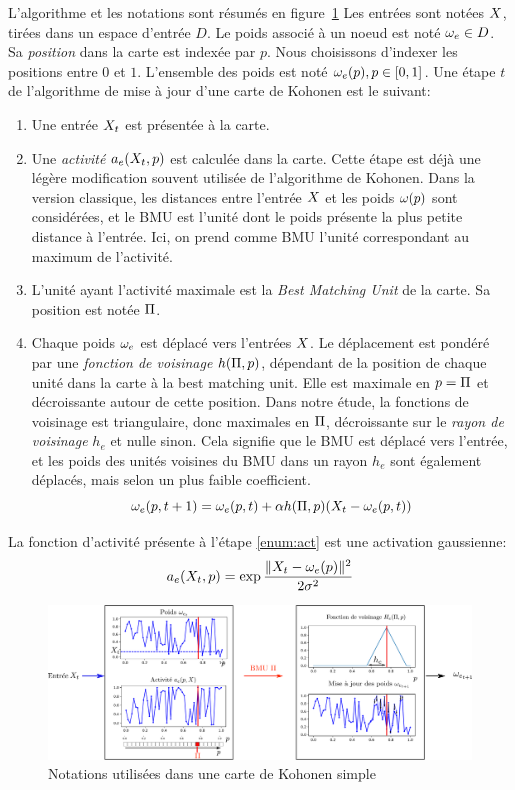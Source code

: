L'algorithme et les notations sont résumés en figure~\ref{fig:one_map_not}
Les entrées sont notées $X$, tirées dans un espace d'entrée $D$. Le poids associé à un noeud est noté $\omega_e \in D$. Sa \emph{position} dans la carte est indexée par $p$. Nous choisissons d'indexer les positions entre $0$ et $1$. L'ensemble des poids est noté ${\omega_e(p), p \in [0,1]}$.
Une étape $t$ de l'algorithme de mise à jour d'une carte de Kohonen est le suivant:
\begin{enumerate}
\item\label{enum:inp} Une entrée $X_t$ est présentée à la carte.
\item\label{enum:act} Une \emph{activité} $a_e(X_t,p)$ est calculée dans la carte. 
Cette étape est déjà une légère modification souvent utilisée de l'algorithme de Kohonen. 
Dans la version classique, les distances entre l'entrée $X$ et les poids $\omega(p)$ sont considérées, et le BMU est l'unité dont le poids présente la plus petite distance à l'entrée. Ici, on prend comme BMU l'unité correspondant au maximum de l'activité.
\item\label{enum:bmu} L'unité ayant l'activité maximale est la \emph{Best Matching Unit} de la carte. Sa position est notée $\Pi$.
\item Chaque poids $\omega_e$ est déplacé vers l'entrées $X$. Le déplacement est pondéré par une \emph{fonction de voisinage} $h(\Pi,p)$, dépendant de la position de chaque unité dans la carte à la best matching unit. Elle est maximale en $p = \Pi$ et décroissante autour de cette position. Dans notre étude, la fonctions de voisinage est triangulaire, donc maximales en $\Pi$, décroissante sur le \emph{rayon de voisinage} $h_e$ et nulle sinon. Cela signifie que le BMU est déplacé vers l'entrée, et les poids des unités voisines du BMU dans un rayon $h_e$ sont également déplacés, mais selon un plus faible coefficient.
\begin{equation}
\omega_e(p,t+1) = \omega_e(p,t) + \alpha h(\Pi,p)(X_t - \omega_e(p,t))
\label{eq:update}
\end{equation}
\end{enumerate}
La fonction d'activité présente à l'étape \ref{enum:act} est une activation gaussienne:
\begin{equation}\label{eq:act}
a_e(X_t,p) = \exp{\frac{\lVert X_t-\omega_{e}(p) \rVert ^2}{2\sigma^2}}
\end{equation}

\begin{figure}
\centering
\includegraphics[width=\textwidth]{one_map_one_layer2.pdf}
\caption{Notations utilisées dans une carte de Kohonen simple}
\label{fig:one_map_not}
\end{figure}

